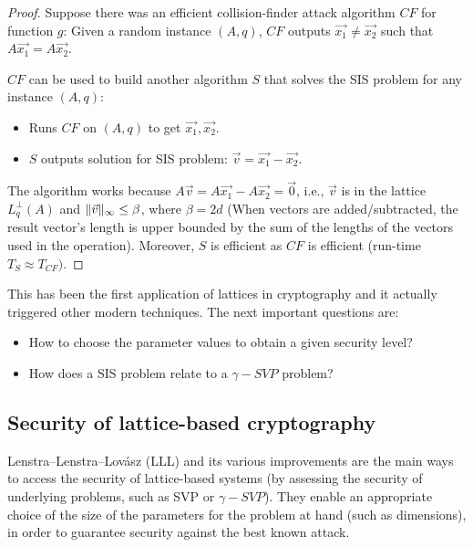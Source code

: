 \begin{proof}
  Suppose there was an efficient collision-finder attack algorithm $CF$ for
  function $g$: Given a random instance $(A,q)$, $CF$ outputs
  $\vec{x_1} \neq \vec{x_2}$ such that $A\vec{x_1} = A\vec{x_2}$.

$CF$ can be used to build another algorithm $S$ that solves the SIS problem
  for any instance $(A,q)$:
  \begin{itemize}
  \item Runs $CF$ on $(A,q)$ to get $\vec{x_1},\vec{x_2}$.
  \item $S$ outputs solution for SIS problem: $\vec{v} = \vec{x_1} - \vec{x_2}$.
  \end{itemize}

  The algorithm works because $A\vec{v} = A\vec{x_1} - A\vec{x_2} = \vec{0}$,
  i.e., $\vec{v}$ is in the lattice $L_q^\bot(A)$ and
  $\Vert \vec{v} \Vert_{\infty} \leq \beta$, where $\beta = 2d$ (When vectors are added/subtracted, the result vector's length is upper bounded by the sum of the lengths
  of the vectors used in the operation). Moreover, $S$ is efficient as $CF$ is efficient (run-time
  $T_S \approx T_{CF})$.
\end{proof}
This has been the first application of lattices in cryptography and it actually
triggered other modern techniques. The next important questions are:
\begin{itemize}
\item How to choose the parameter values to obtain a given security level?
\item How does a SIS problem relate to a $\gamma-SVP$ problem?
\end{itemize}

\subsection{Security of lattice-based cryptography}
\label{sec:latticeSecurity}
Lenstra–Lenstra–Lovász (LLL) and its various improvements are the main ways to
access the security of lattice-based systems (by assessing the security of
underlying problems, such as SVP or $\gamma-SVP$). They enable an appropriate choice of the size of the parameters for the problem at hand (such as dimensions), in order
to guarantee security against the best known attack.

